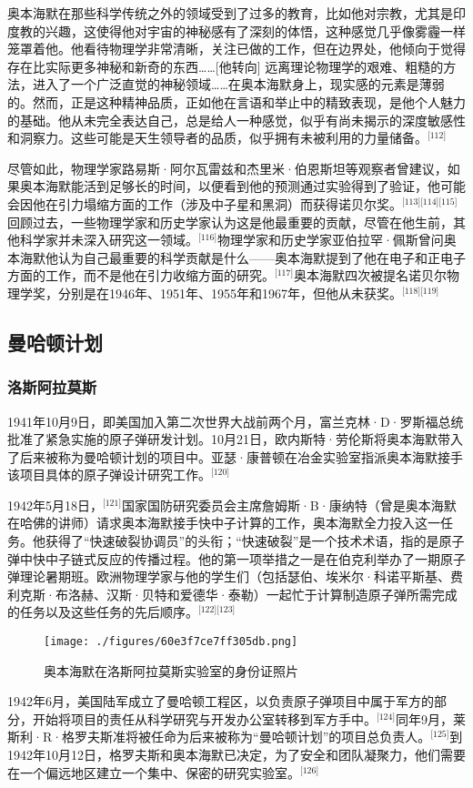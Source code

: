 奥本海默在那些科学传统之外的领域受到了过多的教育，比如他对宗教，尤其是印度教的兴趣，这使得他对宇宙的神秘感有了深刻的体悟，这种感觉几乎像雾霾一样笼罩着他。他看待物理学非常清晰，关注已做的工作，但在边界处，他倾向于觉得存在比实际更多神秘和新奇的东西……[他转向] 远离理论物理学的艰难、粗糙的方法，进入了一个广泛直觉的神秘领域……在奥本海默身上，现实感的元素是薄弱的。然而，正是这种精神品质，正如他在言语和举止中的精致表现，是他个人魅力的基础。他从未完全表达自己，总是给人一种感觉，似乎有尚未揭示的深度敏感性和洞察力。这些可能是天生领导者的品质，似乎拥有未被利用的力量储备。\(^\text{[112]}\)

尽管如此，物理学家路易斯·阿尔瓦雷兹和杰里米·伯恩斯坦等观察者曾建议，如果奥本海默能活到足够长的时间，以便看到他的预测通过实验得到了验证，他可能会因他在引力塌缩方面的工作（涉及中子星和黑洞）而获得诺贝尔奖。\(^\text{[113][114][115]}\)回顾过去，一些物理学家和历史学家认为这是他最重要的贡献，尽管在他生前，其他科学家并未深入研究这一领域。\(^\text{[116]}\)物理学家和历史学家亚伯拉罕·佩斯曾问奥本海默他认为自己最重要的科学贡献是什么——奥本海默提到了他在电子和正电子方面的工作，而不是他在引力收缩方面的研究。\(^\text{[117]}\)奥本海默四次被提名诺贝尔物理学奖，分别是在1946年、1951年、1955年和1967年，但他从未获奖。\(^\text{[118][119]}\)
\subsection{曼哈顿计划}
\subsubsection{洛斯阿拉莫斯}
1941年10月9日，即美国加入第二次世界大战前两个月，富兰克林·D·罗斯福总统批准了紧急实施的原子弹研发计划。10月21日，欧内斯特·劳伦斯将奥本海默带入了后来被称为曼哈顿计划的项目中。亚瑟·康普顿在冶金实验室指派奥本海默接手该项目具体的原子弹设计研究工作。\(^\text{[120]}\)

1942年5月18日，\(^\text{[121]}\)国家国防研究委员会主席詹姆斯·B·康纳特（曾是奥本海默在哈佛的讲师）请求奥本海默接手快中子计算的工作，奥本海默全力投入这一任务。他获得了“快速破裂协调员”的头衔；“快速破裂”是一个技术术语，指的是原子弹中快中子链式反应的传播过程。他的第一项举措之一是在伯克利举办了一期原子弹理论暑期班。欧洲物理学家与他的学生们（包括瑟伯、埃米尔·科诺平斯基、费利克斯·布洛赫、汉斯·贝特和爱德华·泰勒）一起忙于计算制造原子弹所需完成的任务以及这些任务的先后顺序。\(^\text{[122][123]}\)
\begin{figure}[ht]
\centering
\texttt{[image: ./figures/60e3f7ce7ff305db.png]}
\caption{奥本海默在洛斯阿拉莫斯实验室的身份证照片} \label{fig_ABHM_5}
\end{figure}
1942年6月，美国陆军成立了曼哈顿工程区，以负责原子弹项目中属于军方的部分，开始将项目的责任从科学研究与开发办公室转移到军方手中。\(^\text{[124]}\)同年9月，莱斯利·R·格罗夫斯准将被任命为后来被称为“曼哈顿计划”的项目总负责人。\(^\text{[125]}\)到1942年10月12日，格罗夫斯和奥本海默已决定，为了安全和团队凝聚力，他们需要在一个偏远地区建立一个集中、保密的研究实验室。\(^\text{[126]}\)

